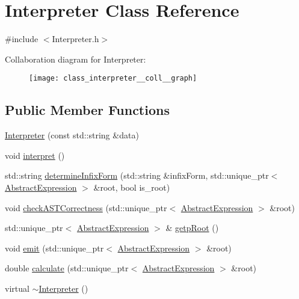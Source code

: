 \hypertarget{class_interpreter}{}\section{Interpreter Class Reference}
\label{class_interpreter}


{\ttfamily \#include $<$Interpreter.\+h$>$}



Collaboration diagram for Interpreter\+:
\nopagebreak
\begin{figure}[H]
\begin{center}
\leavevmode
\texttt{[image: class\_interpreter\_\_coll\_\_graph]}
\end{center}
\end{figure}
\subsection*{Public Member Functions}
\begin{DoxyCompactItemize}
\item 
\mbox{\hyperlink{class_interpreter_a306bccffb1267a2b98da38aca51d15e6}{Interpreter}} (const std\+::string \&data)
\item 
void \mbox{\hyperlink{class_interpreter_ad94c189af098f0c93e16d7b88cc56e5e}{interpret}} ()
\item 
std\+::string \mbox{\hyperlink{class_interpreter_a7ee7897d2775284b4dcd9ba74cdb4688}{determine\+Infix\+Form}} (std\+::string \&infix\+Form, std\+::unique\+\_\+ptr$<$ \mbox{\hyperlink{class_abstract_expression}{Abstract\+Expression}} $>$ \&root, bool is\+\_\+root)
\item 
void \mbox{\hyperlink{class_interpreter_ab8272fcb4cdd34516054165aabe3a2de}{check\+A\+S\+T\+Correctness}} (std\+::unique\+\_\+ptr$<$ \mbox{\hyperlink{class_abstract_expression}{Abstract\+Expression}} $>$ \&root)
\item 
std\+::unique\+\_\+ptr$<$ \mbox{\hyperlink{class_abstract_expression}{Abstract\+Expression}} $>$ \& \mbox{\hyperlink{class_interpreter_a507aaf5f8d77bfa29a05f442e7eff6a0}{getp\+Root}} ()
\item 
void \mbox{\hyperlink{class_interpreter_a5b56d30db52524f4417e99597c56bb8b}{emit}} (std\+::unique\+\_\+ptr$<$ \mbox{\hyperlink{class_abstract_expression}{Abstract\+Expression}} $>$ \&root)
\item 
double \mbox{\hyperlink{class_interpreter_aafb0a178fc895f9b2c718da4cd2f0c53}{calculate}} (std\+::unique\+\_\+ptr$<$ \mbox{\hyperlink{class_abstract_expression}{Abstract\+Expression}} $>$ \&root)
\item 
virtual \mbox{\hyperlink{class_interpreter_a0f96b57f8126e2b5bc63390121e4b5b1}{$\sim$\+Interpreter}} ()
\end{DoxyCompactItemize}
